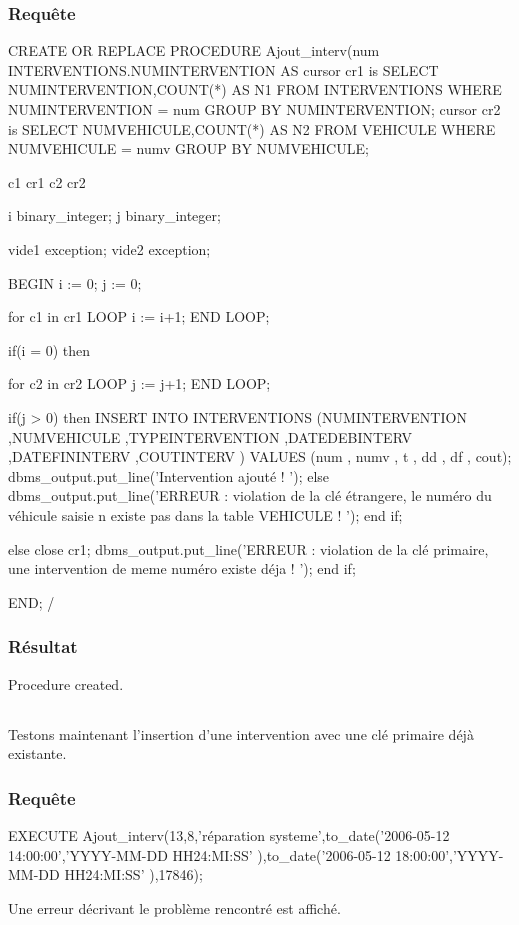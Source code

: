 \documentclass[•]{article}
\begin{document}
\subsubsection{Requête}
\begin{sql}
CREATE OR REPLACE PROCEDURE Ajout_interv(num INTERVENTIONS.NUMINTERVENTION%
AS
cursor cr1 is SELECT NUMINTERVENTION,COUNT(*) AS N1 FROM INTERVENTIONS WHERE NUMINTERVENTION = num GROUP BY NUMINTERVENTION;
cursor cr2 is SELECT NUMVEHICULE,COUNT(*) AS N2 FROM VEHICULE  WHERE NUMVEHICULE = numv GROUP BY NUMVEHICULE;

c1 cr1%
c2 cr2%

i binary_integer;
j binary_integer;

vide1 exception;
vide2 exception;

BEGIN
i := 0;
j := 0;

for c1 in cr1 LOOP
	i := i+1;
END LOOP;

if(i = 0)
then
	
	for c2 in cr2 LOOP
		j := j+1;
	END LOOP;
	
	if(j > 0)
	then
		INSERT INTO INTERVENTIONS (NUMINTERVENTION ,NUMVEHICULE ,TYPEINTERVENTION ,DATEDEBINTERV ,DATEFININTERV ,COUTINTERV ) VALUES (num , numv , t , dd , df , cout);
		dbms_output.put_line('Intervention ajouté ! ');
	else
		dbms_output.put_line('ERREUR : violation de la clé étrangere, le numéro du véhicule saisie n existe pas dans la table VEHICULE ! ');
	end if;
	
else
	close cr1;
	dbms_output.put_line('ERREUR : violation de la clé primaire, une intervention de meme numéro existe déja ! ');
end if;

END;
/
\end{sql}

\subsubsection{Résultat}
\begin{sql}
Procedure created.
\end{sql}

\texttt{  }\\

Testons maintenant l'insertion d'une intervention avec une clé primaire déjà existante.
\subsubsection{Requête}
\begin{sql}
EXECUTE Ajout_interv(13,8,'réparation systeme',to_date('2006-05-12 14:00:00','YYYY-MM-DD HH24:MI:SS' ),to_date('2006-05-12 18:00:00','YYYY-MM-DD HH24:MI:SS' ),17846);
\end{sql}
Une erreur décrivant le problème rencontré est affiché.
\end{document}
